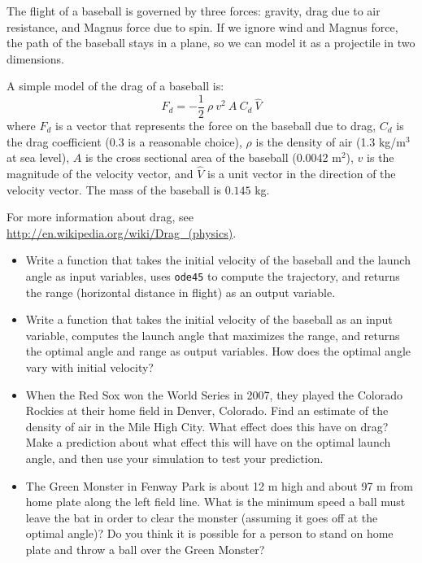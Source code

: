 \documentclass{book}
\begin{document}
\begin{ex}
\label{baseball}

The flight of a baseball is governed by three forces: gravity,
drag due to air resistance, and Magnus force due to spin. If
we ignore wind and Magnus force, the path of the baseball stays
in a plane, so we can model it as a projectile in two
dimensions.

A simple model of the drag of a baseball is:
%
\[ F_d = -\frac{1}{2} ~ \rho ~ v^2 ~ A ~ C_d ~ \hat{V}  \]
%
where $F_d$ is a vector that represents the force on the baseball due
to drag, $C_d$ is the drag coefficient (0.3 is a reasonable choice),
$\rho$ is the density of air (1.3 kg/m$^3$ at sea level), $A$ is the
cross sectional area of the baseball (0.0042 m$^2$), $v$ is the
magnitude of the velocity vector, and $\hat{V}$ is a unit vector in
the direction of the velocity vector. The mass of the baseball is
$0.145$ kg.

For more information about drag, see
\url{http://en.wikipedia.org/wiki/Drag_(physics)}.

\begin{itemize}

\item Write a function that takes the initial velocity of the baseball
and the launch angle as input variables, uses {\tt ode45} to compute
the trajectory, and returns the range (horizontal distance in flight)
as an output variable.

\item Write a function that takes the initial velocity of the baseball
as an input variable, computes the launch angle that maximizes
the range, and returns the optimal angle and range as output variables.
How does the optimal angle vary with initial velocity?

\item When the Red Sox won the World Series in 2007, they played the
Colorado Rockies at their home field in Denver, Colorado. Find an
estimate of the density of air in the Mile High City. What effect
does this have on drag? Make a prediction about what effect this will
have on the optimal launch angle, and then use your simulation to test
your prediction.

\item The Green Monster in Fenway Park is about 12 m high and about 97
m from home plate along the left field line. What is the minimum
speed a ball must leave the bat in order to clear the monster
(assuming it goes off at the optimal angle)? Do you think it is
possible for a person to stand on home plate and throw a
ball over the Green Monster?


\end{itemize}
\end{ex}
\end{document}
